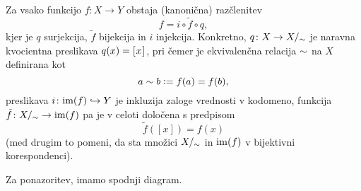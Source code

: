 		\begin{izrek}
			Za vsako funkcijo $f\colon X \to Y$ obstaja (kanonična) razčlenitev
			\[f = i \circ \tilde{f} \circ q,\]
			kjer je $q$ surjekcija, $\tilde{f}$ bijekcija in $i$ injekcija. Konkretno, $q\colon X \to X/_\sim$ je naravna kvocientna preslikava $q(x) = [\:\!{x}\:\!]_{}$, pri čemer je ekvivalenčna relacija $\sim$ na $X$ definirana kot
			\[a \sim b \mathrel{\mathop:}= f(a) = f(b),\]
			preslikava $i\colon \mathrm{im}(f) \hookrightarrow Y$ je inkluzija zaloge vrednosti v kodomeno, funkcija $\tilde{f}\colon X/_\sim \to \mathrm{im}(f)$ pa je v celoti določena s predpisom
			\[\tilde{f}([x]) = f(x)\]
			(med drugim to pomeni, da sta množici $X/_\sim$ in $\mathrm{im}(f)$ v bijektivni korespondenci). 
			
			Za ponazoritev, imamo spodnji diagram.
			
		\end{izrek}
		
		\begin{dokaz}
		\end{dokaz}